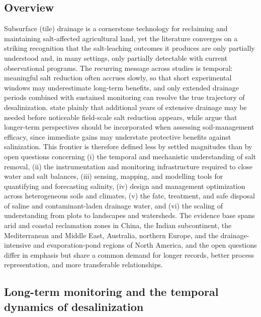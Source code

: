 \subsection{Overview}

Subsurface (tile) drainage is a cornerstone technology for reclaiming and maintaining salt-affected agricultural land, yet the literature converges on a striking recognition that the salt-leaching outcomes it produces are only partially understood and, in many settings, only partially detectable with current observational programs. The recurring message across studies is temporal: meaningful salt reduction often accrues slowly, so that short experimental windows may underestimate long-term benefits, and only extended drainage periods combined with sustained monitoring can resolve the true trajectory of desalinization. \textcite{Almen2021} state plainly that additional years of extensive drainage may be needed before noticeable field-scale salt reduction appears, while \textcite{Daigh2025} argue that longer-term perspectives should be incorporated when assessing soil-management efficacy, since immediate gains may understate protective benefits against salinization. This frontier is therefore defined less by settled magnitudes than by open questions concerning (i) the temporal and mechanistic understanding of salt removal, (ii) the instrumentation and monitoring infrastructure required to close water and salt balances, (iii) sensing, mapping, and modelling tools for quantifying and forecasting salinity, (iv) design and management optimization across heterogeneous soils and climates, (v) the fate, treatment, and safe disposal of saline and contaminant-laden drainage water, and (vi) the scaling of understanding from plots to landscapes and watersheds. The evidence base spans arid and coastal reclamation zones in China, the Indian subcontinent, the Mediterranean and Middle East, Australia, northern Europe, and the drainage-intensive and evaporation-pond regions of North America, and the open questions differ in emphasis but share a common demand for longer records, better process representation, and more transferable relationships.

\subsection{Long-term monitoring and the temporal dynamics of desalinization}

